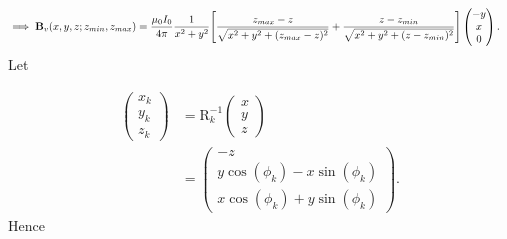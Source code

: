 \documentclass{article}
\let\vec\mathbf
\begin{document}
\[\begin{aligned}
    \implies \vec{B}_{v}(x, y, z; z_{min}, z_{max}) &= \frac{\mu_0 I_0}{4\pi}\frac{1}{x^2+y^2}\qty[\frac{z_{max}-z}{\sqrt{x^2+y^2+(z_{max}-z)^2}} + \frac{z-z_{min}}{\sqrt{x^2+y^2+(z-z_{min})^2}}]
    \begin{pmatrix}
        -y \\
        x \\
        0
    \end{pmatrix}.
\end{aligned}\]
Let 

\[\begin{aligned}
    \begin{pmatrix}
        x_k \\ y_k \\ z_k
    \end{pmatrix} &= \text{R}^{-1}_k
    \begin{pmatrix}
        x \\ y \\ z
    \end{pmatrix} \\
    &= \begin{pmatrix}
        -z \\
        y \cos(\phi_k) - x \sin(\phi_k) \\
        x \cos(\phi_k) + y \sin(\phi_k)
    \end{pmatrix}.
\end{aligned}\]
Hence
\end{document}
